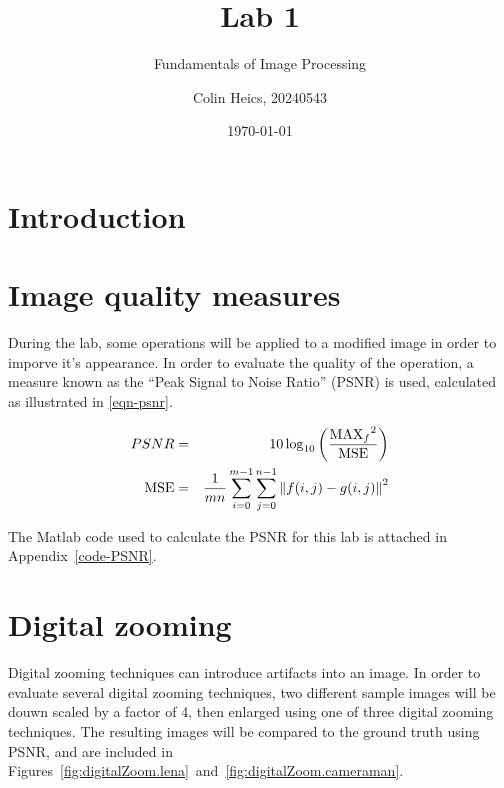 \documentclass[article, 1.5space, letterpaper, 12pt, oneside, header, footer]{SydeClass}
\title{Lab 1}
\subtitle{Fundamentals of Image Processing}
\author{Colin Heics, 20240543}
\date{\today}
\begin{document}



\section{Introduction}



\section{Image quality measures}

During the lab, some operations will be applied to a modified image in order to imporve it's appearance. In order to evaluate the quality of the operation, a measure known as the ``Peak Signal to Noise Ratio'' (PSNR) is used, calculated as illustrated in \eqref{eqn-psnr}.

\begin{eqnarray}
\label{eqn-psnr}
PSNR & = & 10 \log_{10}\left ( \frac{{\textup{MAX}_f}^{2}}{\textup{MSE}} \right ) \\
\textup{MSE} & = &\frac{1}{mn} \sum_{i=0}^{m-1}\sum_{j=0}^{n-1} \left \| f(i,j) - g(i,j) \right \|^2
\end{eqnarray}

The Matlab code used to calculate the PSNR for this lab is attached in Appendix~\ref{code-PSNR}.


\section{Digital zooming}

Digital zooming techniques can introduce artifacts into an image. In order to evaluate several digital zooming techniques, two different sample images will be douwn scaled by a factor of 4, then enlarged using one of three digital zooming techniques. The resulting images will be compared to the ground truth using PSNR, and are included in Figures~\ref{fig:digitalZoom.lena}~and~\ref{fig:digitalZoom.cameraman}.
\end{document}
